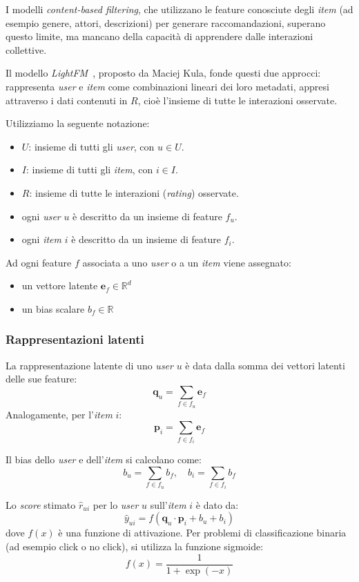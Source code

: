 I modelli \textit{content-based filtering}, che utilizzano le feature conosciute degli \textit{item} (ad esempio genere, attori, descrizioni) per generare raccomandazioni, superano questo limite, ma mancano della capacità di apprendere dalle interazioni collettive.

Il modello \textit{LightFM}~\cite{LightFM}, proposto da Maciej Kula, fonde questi due approcci: rappresenta \textit{user} e \textit{item} come combinazioni lineari dei loro metadati, appresi attraverso i dati contenuti in $R$, cioè l'insieme di tutte le interazioni osservate.

Utilizziamo la seguente notazione:
\begin{itemize}
    \item $U$: insieme di tutti gli \textit{user}, con $u \in U$.
    \item $I$: insieme di tutti gli \textit{item}, con $i \in I$.
    \item $R$: insieme di tutte le interazioni (\textit{rating}) osservate.
    \item ogni \textit{user} $u$ è descritto da un insieme di feature $f_u$.
    \item ogni \textit{item} $i$ è descritto da un insieme di feature $f_i$.
\end{itemize}

Ad ogni feature $f$ associata a uno \textit{user} o a un \textit{item} viene assegnato:
\begin{itemize}
    \item un vettore latente $\mathbf{e}_f \in \mathbb{R}^d$
    \item un bias scalare $b_f \in \mathbb{R}$
\end{itemize}

\subsubsection{Rappresentazioni latenti}
La rappresentazione latente di uno \textit{user} $u$ è data dalla somma dei vettori latenti delle sue feature:
\[
\mathbf{q}_u = \sum_{f \in f_u} \mathbf{e}_f
\]
Analogamente, per l'\textit{item} $i$:
\[
\mathbf{p}_i = \sum_{f \in f_i} \mathbf{e}_f
\]

Il bias dello \textit{user} e dell'\textit{item} si calcolano come:
\[
b_u = \sum_{f \in f_u} b_f, \quad b_i = \sum_{f \in f_i} b_f
\]

Lo \textit{score} stimato $\hat{r}_{ui}$ per lo \textit{user} $u$ sull'\textit{item} $i$ è dato da:
\[
\hat{y}_{ui} = f\left( \mathbf{q}_u \cdot \mathbf{p}_i + b_u + b_i \right)
\]
dove $f(x)$ è una funzione di attivazione. Per problemi di classificazione binaria (ad esempio click o no click), si utilizza la funzione sigmoide:
\[
f(x) = \frac{1}{1 + \exp(-x)}
\]

